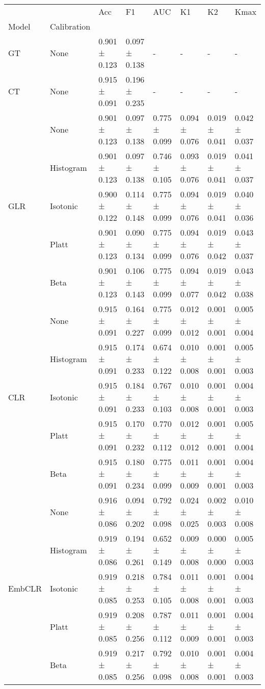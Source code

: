 \begin{tabular}{llllllll}
\toprule
 &  & Acc & F1 & AUC & K1 & K2 & Kmax \\
Model & Calibration &  &  &  &  &  &  \\
\midrule
GT & None & 0.901 ± 0.123 & 0.097 ± 0.138 & - & - & - & - \\
\cline{1-8}
CT & None & 0.915 ± 0.091 & 0.196 ± 0.235 & - & - & - & - \\
\cline{1-8}
\multirow[t]{5}{*}{GLR} & None & 0.901 ± 0.123 & 0.097 ± 0.138 & 0.775 ± 0.099 & 0.094 ± 0.076 & 0.019 ± 0.041 & 0.042 ± 0.037 \\
 & Histogram & 0.901 ± 0.123 & 0.097 ± 0.138 & 0.746 ± 0.105 & 0.093 ± 0.076 & 0.019 ± 0.041 & 0.041 ± 0.037 \\
 & Isotonic & 0.900 ± 0.122 & 0.114 ± 0.148 & 0.775 ± 0.099 & 0.094 ± 0.076 & 0.019 ± 0.041 & 0.040 ± 0.036 \\
 & Platt & 0.901 ± 0.123 & 0.090 ± 0.134 & 0.775 ± 0.099 & 0.094 ± 0.076 & 0.019 ± 0.042 & 0.043 ± 0.037 \\
 & Beta & 0.901 ± 0.123 & 0.106 ± 0.143 & 0.775 ± 0.099 & 0.094 ± 0.077 & 0.019 ± 0.042 & 0.043 ± 0.038 \\
\cline{1-8}
\multirow[t]{5}{*}{CLR} & None & 0.915 ± 0.091 & 0.164 ± 0.227 & 0.775 ± 0.099 & 0.012 ± 0.012 & 0.001 ± 0.001 & 0.005 ± 0.004 \\
 & Histogram & 0.915 ± 0.091 & 0.174 ± 0.233 & 0.674 ± 0.122 & 0.010 ± 0.008 & 0.001 ± 0.001 & 0.005 ± 0.003 \\
 & Isotonic & 0.915 ± 0.091 & 0.184 ± 0.233 & 0.767 ± 0.103 & 0.010 ± 0.008 & 0.001 ± 0.001 & 0.004 ± 0.003 \\
 & Platt & 0.915 ± 0.091 & 0.170 ± 0.232 & 0.770 ± 0.112 & 0.012 ± 0.012 & 0.001 ± 0.001 & 0.005 ± 0.004 \\
 & Beta & 0.915 ± 0.091 & 0.180 ± 0.234 & 0.775 ± 0.099 & 0.011 ± 0.009 & 0.001 ± 0.001 & 0.004 ± 0.003 \\
\cline{1-8}
\multirow[t]{5}{*}{EmbCLR} & None & 0.916 ± 0.086 & 0.094 ± 0.202 & 0.792 ± 0.098 & 0.024 ± 0.025 & 0.002 ± 0.003 & 0.010 ± 0.008 \\
 & Histogram & 0.919 ± 0.086 & 0.194 ± 0.261 & 0.652 ± 0.149 & 0.009 ± 0.008 & 0.000 ± 0.000 & 0.005 ± 0.003 \\
 & Isotonic & 0.919 ± 0.085 & 0.218 ± 0.253 & 0.784 ± 0.105 & 0.011 ± 0.008 & 0.001 ± 0.001 & 0.004 ± 0.003 \\
 & Platt & 0.919 ± 0.085 & 0.208 ± 0.256 & 0.787 ± 0.112 & 0.011 ± 0.009 & 0.001 ± 0.001 & 0.004 ± 0.003 \\
 & Beta & 0.919 ± 0.085 & 0.217 ± 0.256 & 0.792 ± 0.098 & 0.010 ± 0.008 & 0.001 ± 0.001 & 0.004 ± 0.003 \\
\cline{1-8}
\bottomrule
\end{tabular}
